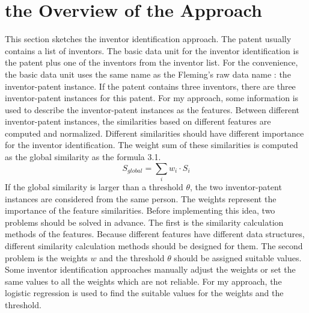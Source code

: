 \section{the Overview of the Approach}
This section sketches the inventor identification approach. The patent usually contains a list of inventors. The basic data unit for the inventor identification is the patent plus one of the inventors from the inventor list. For the convenience, the basic data unit uses the same name as the Fleming's raw data name \cite{RePEc:eee:respol:v:43:y:2014:i:6:p:941-955}: the inventor-patent instance. If the patent contains three inventors, there are three inventor-patent instances for this patent. For my approach, some information is used to describe the inventor-patent instances as the features. Between different inventor-patent instances, the similarities based on different features are computed and normalized. Different similarities should have different importance for the inventor identification. The weight sum of these similarities is computed as the global similarity as the formula 3.1. 
\begin{equation}
S_{global}=\sum_i w_i \cdot S_i 
\end{equation}
If the global similarity is larger than a threshold $\theta$, the two inventor-patent  instances are considered from the same person. The weights represent the importance of the feature similarities.
Before implementing this idea, two problems should be solved in advance. The first is the similarity calculation methods of the features. Because different features have different data structures, different similarity calculation methods should be designed for them. The second problem is the weights $w$ and the threshold $\theta$ should be assigned suitable values. Some inventor identification approaches manually adjust the weights or set the same values to all the weights which are not reliable. For my approach, the logistic regression is used to find the suitable values for the weights and the threshold. 
\newline

